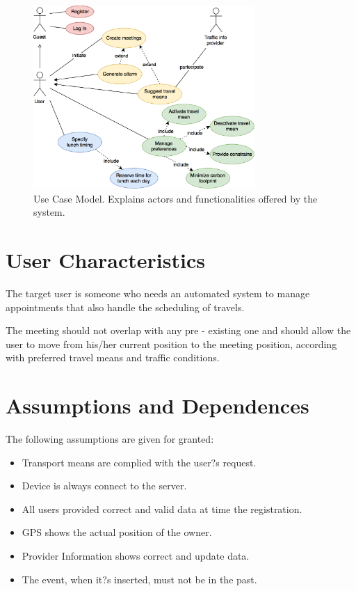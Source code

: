 \documentclass{report}
\begin{document}
	\bigskip
	\bigskip
	\begin{figure}[htbp]
		\begin{center}
		\includegraphics[width=0.75\textwidth]{img/UseCaseModel.png}
		\caption{Use Case Model. Explains actors and functionalities offered by the system.}
		\label{default}
		\end{center}
	\end{figure}
	
	
	\section{User Characteristics}
	The target user is someone who needs an automated system to manage appointments that also handle the scheduling of travels.
	
	The meeting should not overlap with any pre - existing one and should allow the user to move from his/her current position to the meeting position, according with preferred travel means and traffic conditions.
	
	
	\section{Assumptions and Dependences}
	The following assumptions are given for granted:
	\begin{itemize}
	\item  Transport means are complied with the user?s request.
	\item  Device is always connect to the server.
	\item  All users provided correct and valid data at time the registration.
	\item  GPS shows the actual position of the owner.
	\item  Provider Information shows correct and update data.
	\item  The event, when it?s inserted, must not be in the past.
	\end{itemize}
	
\end{document}
